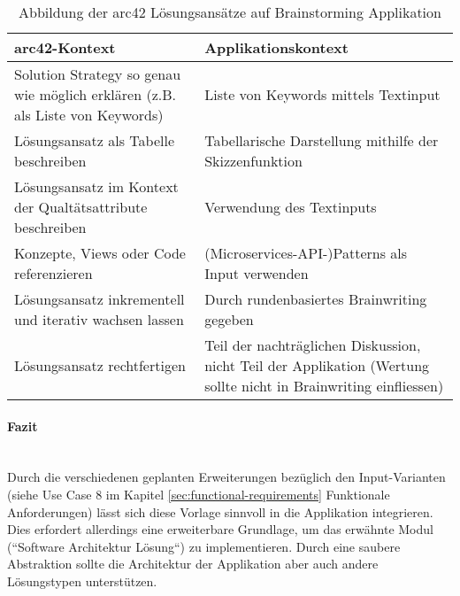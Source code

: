 \renewcommand{\arraystretch}{1.7}
\begin{table}[h]
	\centering
	\begin{tabular}{|p{6cm}|p{6cm}|}
		\hline
		\textbf{arc42-Kontext} & \textbf{Applikationskontext}\\
		\hline
		Solution Strategy so genau wie möglich erklären (z.B. als Liste von Keywords) & Liste von Keywords mittels Textinput \\
		\hline
		Lösungsansatz als Tabelle beschreiben & Tabellarische Darstellung mithilfe der Skizzenfunktion\\
		\hline
		Lösungsansatz im Kontext der Qualtätsattribute beschreiben & Verwendung des Textinputs\\
		\hline
		Konzepte, Views oder Code referenzieren & (Microservices-API-)Patterns als Input verwenden\\
		\hline
		Lösungsansatz inkrementell und iterativ wachsen lassen & Durch rundenbasiertes Brainwriting gegeben\\
		\hline
		Lösungsansatz rechtfertigen & Teil der nachträglichen Diskussion, nicht Teil der Applikation (Wertung sollte nicht in Brainwriting einfliessen)\\
		\hline
	\end{tabular}
	\caption{Abbildung der arc42 Lösungsansätze auf Brainstorming Applikation}
	\label{tab:arc42-mapping}
\end{table}
\paragraph{Fazit}~\\
Durch die verschiedenen geplanten Erweiterungen bezüglich den Input-Varianten (siehe Use Case 8 im Kapitel \ref{sec:functional-requirements} Funktionale Anforderungen) lässt sich diese Vorlage sinnvoll in die Applikation integrieren. Dies erfordert allerdings eine erweiterbare Grundlage, um das erwähnte Modul (``Software Architektur Lösung``) zu implementieren. Durch eine saubere Abstraktion sollte die Architektur der Applikation aber auch andere Lösungstypen unterstützen.